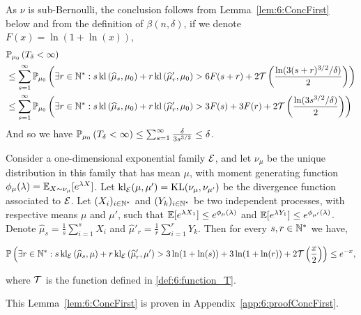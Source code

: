 \begin{smallproof}
As $\nu$ is sub-Bernoulli, the conclusion follows from Lemma~\ref{lem:6:ConcFirst} below and from the definition of $\beta(n,\delta)$, if we denote $F(x)=\ln(1+\ln(x))$,
%
\begin{align*}
    &\mathbb{P}_{\mu_0}\left(T_{\delta} < \infty\right) \\
    & \leq \sum_{s =1}^{\infty} \mathbb{P}_{\mu_0}\left(\exists r \in \mathbb{N}^* : s \, \mathrm{kl}\left(\widehat{\mu}_{s},\mu_0\right) + r \, \mathrm{kl}\left(\widehat{\mu}'_{r},\mu_0\right) > 6F(s+r)+ 2 \mathcal{T}\left(\frac{\ln(3(s+r)^{3/2}/\delta)}{2}\right)\right)\\
    & \leq \sum_{s =1}^{\infty} \mathbb{P}_{\mu_0}\left(\exists r \in \mathbb{N}^* : s \, \mathrm{kl}\left(\widehat{\mu}_{s},\mu_0\right) + r \, \mathrm{kl}\left(\widehat{\mu}'_{r},\mu_0\right) > 3F(s)+3F(r) + 2 \mathcal{T}\left(\frac{\ln(3s^{3/2}/\delta)}{2}\right)\right)
\end{align*}
%
And so we have $\mathbb{P}_{\mu_0}\left(T_{\delta} < \infty\right) \leq \sum_{s =1}^{\infty} \frac{\delta}{3s^{3/2}} \leq \delta$.
%
\end{smallproof}

\begin{lemma}\label{lem:6:ConcFirst}
\begin{leftbar}[lemmabar]  %
    Consider a one-dimensional exponential family $\mathcal{E}$,
    and let $\nu_{\mu}$ be the unique distribution in this family that has mean $\mu$,
    with moment generating function $\phi_\mu(\lambda) = \mathbb{E}_{X \sim \nu_{\mu}}[e^{\lambda X}]$.
    Let $\mathrm{kl}_{\mathcal{E}}(\mu,\mu') = \mathrm{KL}(\nu_{\mu},\nu_{\mu'})$ be the divergence function associated to $\mathcal{E}$.
    Let $(X_i)_{i \in \mathbb{N}^*}$ and $(Y_k)_{i \in \mathbb{N}^*}$ be two independent \iid{} processes, with respective means $\mu$ and $\mu'$, such that
    $\mathbb{E}[e^{\lambda X_1}] \leq e^{\phi_{\mu}(\lambda)}$ and $\mathbb{E}[e^{\lambda Y_1}] \leq e^{\phi_{\mu'}(\lambda)}$.
    Denote $\widehat{\mu}_s = \frac{1}{s}\sum\limits_{i=1}^s X_i$ and $\widehat{\mu}'_r = \frac{1}{r}\sum\limits_{i=1}^r Y_k$.
    Then for every $s,r \in \mathbb{N}^*$ we have,
    \begin{small}
        \begin{equation}
            \mathbb{P}\left(\exists r \in \mathbb{N}^* : s \, \mathrm{kl}_{\mathcal{E}}\left(\widehat{\mu}_{s},\mu\right) + r \, \mathrm{kl}_{\mathcal{E}}\left(\widehat{\mu}_r',\mu'\right) > 3\ln(1+\ln(s)) + 3\ln(1+\ln(r)) + 2\mathcal{T}\left(\frac{x}{2}\right)\right)\leq e^{-x},
        \end{equation}
    \end{small}
    where $\mathcal{T}$ is the function defined in \eqref{def:6:function_T}.
\end{leftbar}  %
\end{lemma}
\begin{smallproof}
    This Lemma~\ref{lem:6:ConcFirst} is proven in Appendix~\ref{app:6:proofConcFirst}.
\end{smallproof}


